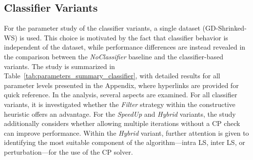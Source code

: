 \subsection{Classifier Variants}
\label{subsec_parameterStuy_speedup}
For the parameter study of the classifier variants, a single dataset (GD-Shrinked-WS) is used. This choice is motivated
by the fact that classifier behavior is independent of the dataset, while performance differences are instead revealed in
the comparison between the \textit{NoClassifier} baseline and the classifier-based variants. The study is summarized in
Table~\ref{tab:parameters_summary_classifier}, with detailed results for all parameter levels presented in the Appendix,
where hyperlinks are provided for quick reference.
In the analysis, several aspects are examined. For all classifier variants, it is investigated whether the \textit{Filter} strategy
within the constructive heuristic offers an advantage. For the \textit{SpeedUp} and \textit{Hybrid} variants, the study additionally
considers whether allowing multiple iterations without a \gls{CP} check can improve performance. Within the \textit{Hybrid} variant,
further attention is given to identifying the most suitable component of the algorithm—intra \gls{LS}, inter \gls{LS}, or
perturbation—for the use of the \gls{CP} solver.

